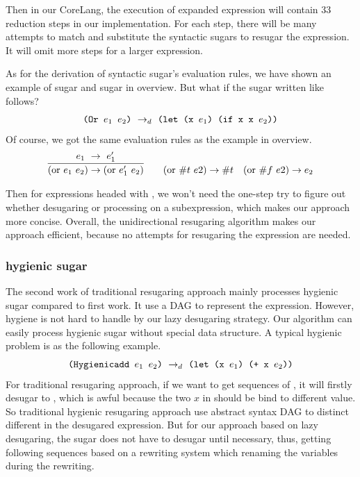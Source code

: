 Then in our CoreLang, the execution of expanded expression will contain 33 reduction steps in our implementation. For each step, there will be many attempts to match and substitute the syntactic sugars to resugar the expression. It will omit more steps for a larger expression.

As for the derivation of syntactic sugar's evaluation rules, we have shown an example of  sugar and  sugar in overview. But what if the  sugar written like follows?
\[\texttt{(Or $e_1$ $e_2$)} ~\rightarrow_d~ \texttt{(let (x $e_1$) (if x x $e_2$))}\]
Of course, we got the same evaluation rules as the example in overview.
\[
\begin{array}{c}
\infer {(\mbox{or}~e_1~e_2) \rightarrow (\mbox{or}~e_1'~e_2)} {e_1~ \rightarrow~e_1'}
\qquad
(\mbox{or}~\#t~e2) \rightarrow \#t
\quad
(\mbox{or}~\#f~e2) \rightarrow e_2 \\
\end{array}
\]

Then for expressions headed with , we won't need the one-step try to figure out whether desugaring or processing on a subexpression, which makes our approach more concise. Overall, the unidirectional resugaring algorithm makes our approach efficient, because no attempts for resugaring the expression are needed.
\subsubsection{hygienic sugar}
\label{mark:hygienic}


The second work\cite{hygienic} of traditional resugaring approach mainly processes hygienic sugar compared to first work. It use a DAG to represent the expression. However, hygiene is not hard to handle by our lazy desugaring strategy. Our algorithm can easily process hygienic sugar without special data structure.
A typical hygienic problem is as the following example.
\[
\texttt{(Hygienicadd $e_1$ $e_2$)} ~\rightarrow_d~ \texttt{(let (x $e_1$) (+ x $e_2$))}
\]
For traditional resugaring approach, if we want to get sequences of , it will firstly desugar to , which is awful because the two $x$ in  should be bind to different value. So traditional hygienic resugaring approach use abstract syntax DAG to distinct different  in the desugared expression. But for our approach based on lazy desugaring, the  sugar does not have to desugar until necessary, thus, getting following sequences based on a  rewriting system which renaming the variables during the rewriting.

